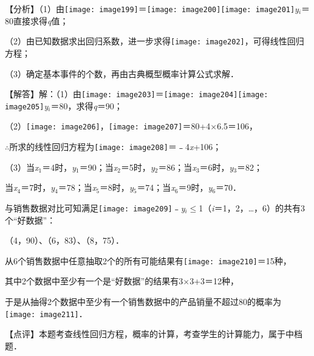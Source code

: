 \documentclass[a4paper,11pt,UTF8,twoside]{ctexart} %
\begin{document}
【分析】（1）由\texttt{[image: image199]}＝\texttt{[image: image200]}\texttt{[image: image201]}\textit{y${}_{i}$}＝80直接求得\textit{q}值；

（2）由已知数据求出回归系数，进一步求得\texttt{[image: image202]}，可得线性回归方程；

（3）确定基本事件的个数，再由古典概型概率计算公式求解．

【解答】解：（1）由\texttt{[image: image203]}＝\texttt{[image: image204]}\texttt{[image: image205]}\textit{y${}_{i}$}＝80，求得\textit{q}＝90；

（2）\texttt{[image: image206]}，\texttt{[image: image207]}＝80+4$\mathrm{\times}$6.5＝106，

$\mathrm{\therefore}$所求的线性回归方程为\texttt{[image: image208]}＝﹣4\textit{x}+106；

（3）当\textit{x}${}_{1}$＝4时，\textit{y}${}_{1}$＝90；当\textit{x}${}_{2}$＝5时，\textit{y}${}_{2}$＝86；当\textit{x}${}_{3}$＝6时，\textit{y}${}_{3}$＝82；

当\textit{x}${}_{4}$＝7时，\textit{y}${}_{4}$＝78；当\textit{x}${}_{5}$＝8时，\textit{y}${}_{5}$＝74；当\textit{x}${}_{6}$＝9时，\textit{y}${}_{6}$＝70．

与销售数据对比可知满足{\textbar}\texttt{[image: image209]}﹣\textit{y${}_{i}$}{\textbar}$\mathrm{\le}$1（\textit{i}＝1，2，{\dots}，6）的共有3个``好数据''：

（4，90）、（6，83）、（8，75）．

从6个销售数据中任意抽取2个的所有可能结果有\texttt{[image: image210]}＝15种，

其中2个数据中至少有一个是``好数据''的结果有3$\mathrm{\times}$3+3＝12种，

于是从抽得2个数据中至少有一个销售数据中的产品销量不超过80的概率为\texttt{[image: image211]}．

【点评】本题考查线性回归方程，概率的计算，考查学生的计算能力，属于中档题．
\end{document}
